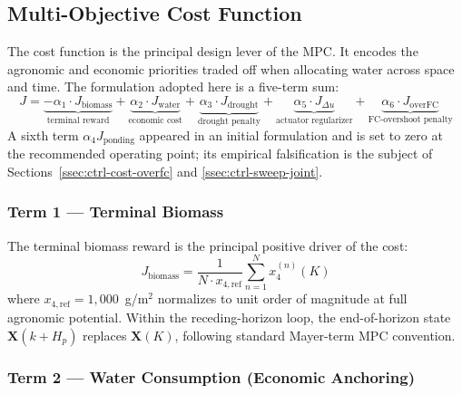 \subsection{Multi-Objective Cost Function}
\label{ssec:ctrl-cost}

The cost function is the principal design lever of the MPC. It encodes the
agronomic and economic priorities traded off when allocating water across
space and time. The formulation adopted here is a five-term sum:
\begin{equation}
J =
  \underbrace{-\alpha_1 \cdot J_{\mathrm{biomass}}}_{\text{terminal reward}}
+ \underbrace{\alpha_2 \cdot J_{\mathrm{water}}}_{\text{economic cost}}
+ \underbrace{\alpha_3 \cdot J_{\mathrm{drought}}}_{\text{drought penalty}}
+ \underbrace{\alpha_5 \cdot J_{\Delta u}}_{\text{actuator regularizer}}
+ \underbrace{\alpha_6 \cdot J_{\mathrm{overFC}}}_{\text{FC-overshoot penalty}}
\label{eq:cost-fn}
\end{equation}
A sixth term $\alpha_4 J_{\mathrm{ponding}}$ appeared in an initial
formulation and is set to zero at the recommended operating point; its
empirical falsification is the subject of
Sections~\ref{ssec:ctrl-cost-overfc} and \ref{ssec:ctrl-sweep-joint}.

\subsubsection*{Term 1 — Terminal Biomass}

The terminal biomass reward is the principal positive driver of the cost:
\begin{equation}
J_{\mathrm{biomass}} = \frac{1}{N \cdot x_{4,\mathrm{ref}}}
  \sum_{n=1}^{N} x_4^{(n)}(K)
\label{eq:J-biomass}
\end{equation}
where $x_{4,\mathrm{ref}} = 1{,}000$~g/m$^2$ normalizes to unit order of
magnitude at full agronomic potential. Within the receding-horizon loop, the
end-of-horizon state $\mathbf{X}(k+H_p)$ replaces $\mathbf{X}(K)$,
following standard Mayer-term MPC convention.

\subsubsection*{Term 2 — Water Consumption (Economic Anchoring)}

